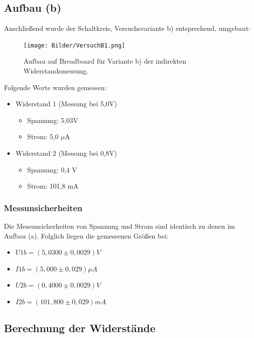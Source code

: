 \documentclass[
  9pt,
]{article}
\begin{document}
\hypertarget{aufbau-b}{%
\subsection{Aufbau (b)}\label{aufbau-b}}

Anschließend wurde der Schaltkreis, Versuchsvariante b) entsprechend,
umgebaut:

\begin{figure}
\centering
\texttt{[image: Bilder/VersuchB1.png]}
\caption{Aufbau auf Breadboard für Variante b) der indirekten
Widerstandsmessung.}
\end{figure}

Folgende Werte wurden gemessen:

\begin{itemize}
\item {Widerstand 1 (Messung bei 5,0V)}
\begin{itemize}
\item {Spannung: 5,03V}
\item {Strom: 5,0 $\mu$A}
\end{itemize}
\item {Widerstand 2 (Messung bei 0,8V)}
\begin{itemize}
\item {Spannung: 0,4 V}
\item {Strom: 101,8 mA}
\end{itemize}
\end{itemize}

\hypertarget{messunsicherheiten-2}{%
\subsubsection{Messunsicherheiten}\label{messunsicherheiten-2}}

Die Messunsicherheiten von Spannung und Strom sind identisch zu denen im
Aufbau (a). Folglich liegen die gemessenen Größen bei:

\begin{itemize}
\item $U1b = (5,0300 \pm 0,0029)V$
\item $I1b = (5,000 \pm 0,029) \mu A$
\item $U2b = (0,4000 \pm 0,0029)V$
\item $I2b = (101,800 \pm 0,029) mA$
\end{itemize}

\hypertarget{berechnung-der-widerstuxe4nde-1}{%
\subsection{Berechnung der
Widerstände}\label{berechnung-der-widerstuxe4nde-1}}
\end{document}
